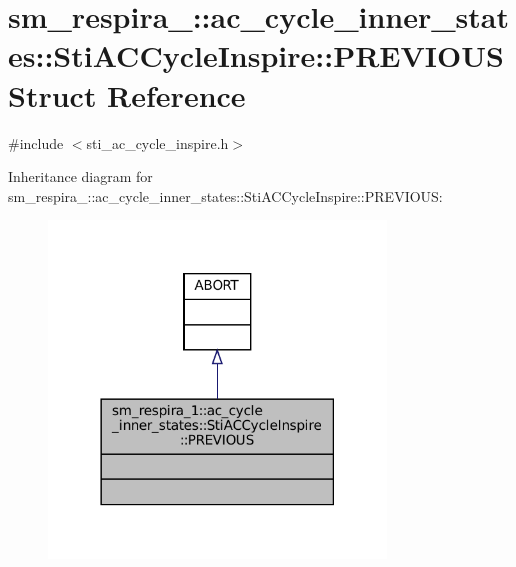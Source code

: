 \hypertarget{structsm__respira__1_1_1ac__cycle__inner__states_1_1StiACCycleInspire_1_1PREVIOUS}{}\section{sm\+\_\+respira\+\_\+:\+:ac\+\_\+cycle\+\_\+inner\+\_\+states\+:\+:Sti\+A\+C\+Cycle\+Inspire\+:\+:P\+R\+E\+V\+I\+O\+US Struct Reference}
\label{structsm__respira__1_1_1ac__cycle__inner__states_1_1StiACCycleInspire_1_1PREVIOUS}


{\ttfamily \#include $<$sti\+\_\+ac\+\_\+cycle\+\_\+inspire.\+h$>$}



Inheritance diagram for sm\+\_\+respira\+\_\+:\+:ac\+\_\+cycle\+\_\+inner\+\_\+states\+:\+:Sti\+A\+C\+Cycle\+Inspire\+:\+:P\+R\+E\+V\+I\+O\+US\+:
\nopagebreak
\begin{figure}[H]
\begin{center}
\leavevmode
\includegraphics[width=254pt]{structsm__respira__1_1_1ac__cycle__inner__states_1_1StiACCycleInspire_1_1PREVIOUS__inherit__graph}
\end{center}
\end{figure}


